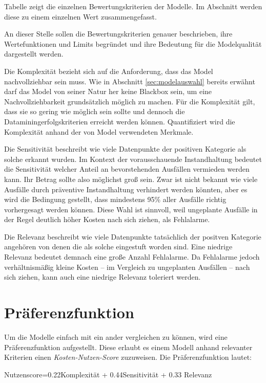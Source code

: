 Tabelle  zeigt die einzelnen Bewertungskriterien der Modelle. Im Abschnitt  werden diese zu einem einzelnen Wert zusammengefasst. 

An dieser Stelle sollen die Bewertungskriterien genauer beschrieben, ihre Wertefunktionen und Limits begründet und ihre Bedeutung für die Modelqualität dargestellt werden.

Die Komplexität bezieht sich auf die Anforderung, dass das Model nachvollziehbar sein muss. Wie in Abschnitt \cref{sec:modelauswahl} bereits erwähnt darf das Model von seiner Natur her keine Blackbox sein, um eine Nachvollziehbarkeit grundsätzlich möglich zu machen. Für die Komplexität gilt, dass sie so gering wie möglich sein sollte und dennoch die Dataminingerfolgskriterien erreicht werden können. Quantifiziert wird die Komplexität anhand der von Model verwendeten Merkmale. 

Die Sensitivität beschreibt wie viele Datenpunkte der positiven Kategorie als solche erkannt wurden. Im Kontext der vorausschauende Instandhaltung bedeutet die Sensitivität welcher Anteil an bevorstehenden Ausfällen vermieden werden kann. Ihr Betrag sollte also möglichst groß sein. Zwar ist nicht bekannt wie viele Ausfälle durch präventive Instandhaltung verhindert werden könnten, aber es wird die Bedingung gestellt, dass mindestens 95\% aller Ausfälle richtig vorhergesagt werden können. Diese Wahl ist sinnvoll, weil ungeplante Ausfälle in der Regel deutlich höher Kosten nach sich ziehen, als Fehlalarme.

Die Relevanz beschreibt wie viele Datenpunkte tatsächlich der positven Kategorie angehören von denen die als solche eingestuft worden sind. Eine niedrige Relevanz bedeutet demnach eine große Anzahl Fehlalarme. Da Fehlalarme jedoch verhältnismäßig kleine Kosten -- im Vergleich zu ungeplanten Ausfällen -- nach sich ziehen, kann auch eine niedrige Relevanz toleriert werden.


\section{Präferenzfunktion}
\label{sec:präferenzfunktion}

Um die Modelle einfach mit ein ander vergleichen zu können, wird eine Präferenzfunktion aufgestellt. Diese erlaubt es einem Modell anhand relevanter Kriterien einen \textit{Kosten-Nutzen-Score} zuzuweisen. Die Präferenzfunktion lautet:
\begin{center}
    Nutzenscore=\num{0,22}\bullet Komplexität + \num{0,44}\bullet Sensitivität + \num{0,33} \bullet Relevanz
\end{center}


